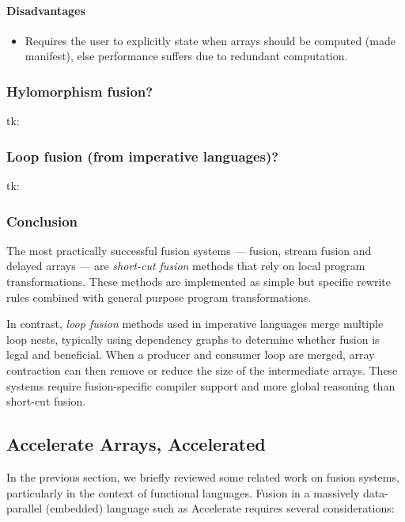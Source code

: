 \paragraph{Disadvantages}
\begin{itemize}
    \item Requires the user to explicitly state when arrays should be computed
        (made manifest), else performance suffers due to redundant computation.
\end{itemize}

\subsubsection{Hylomorphism fusion?}
tk: \citet{Takano:1995}

\subsubsection{Loop fusion (from imperative languages)?}
tk: \citet{Warren:1984ka,Sarkar:1991ff}


\subsubsection{Conclusion}

The most practically successful fusion systems ---
 fusion, stream
fusion and delayed arrays --- are \emph{short-cut
fusion} methods that rely on local program
transformations. These methods are implemented as simple but specific rewrite
rules combined with general purpose program transformations.

In contrast, \emph{loop fusion} methods used in imperative
languages merge multiple loop nests, typically using dependency
graphs to determine whether fusion is legal and beneficial.
When a producer and consumer loop are merged, array
contraction can then remove or reduce the size of the
intermediate arrays. These systems require fusion-specific compiler support and
more global reasoning than short-cut fusion.


\subsection{Accelerate Arrays, Accelerated}

In the previous section, we briefly reviewed some related work on fusion
systems, particularly in the context of functional languages. Fusion in a
massively data-parallel (embedded) language such as Accelerate requires several
considerations:

